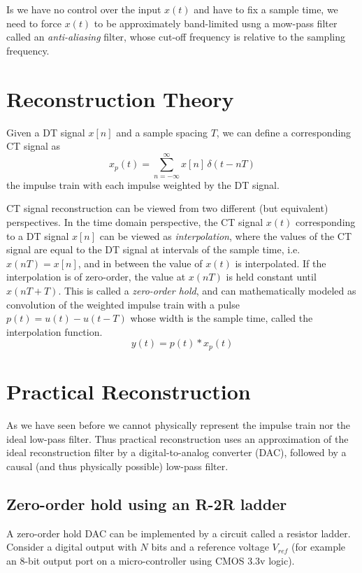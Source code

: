 \documentclass{article}
\begin{document}
Is we have no control over the input $x(t)$ and have to fix a sample time, we need to force $x(t)$ to be approximately band-limited usng a mow-pass filter called an \textit{anti-aliasing} filter, whose cut-off frequency is relative to the sampling frequency.

\section{Reconstruction Theory}

Given a DT signal $x[n]$ and a sample spacing $T$, we can define a corresponding CT signal as 
\[
x_p(t) = \sum\limits_{n = -\infty}^{\infty} x[n] \, \delta(t-nT)
\]
the impulse train with each impulse weighted by the DT signal.

CT signal reconstruction can be viewed from two different (but equivalent) perspectives. In the time domain perspective, the CT signal $x(t)$ corresponding to a DT signal $x[n]$ can be viewed as \emph{interpolation}, where the values of the CT signal are equal to the DT signal at intervals of the sample time, i.e. $x(nT) = x[n]$, and in between the value of $x(t)$ is interpolated. If the interpolation is of zero-order, the value at $x(nT)$ is held constant until $x(nT+T)$. This is called a \emph{zero-order hold}, and can mathematically modeled as convolution of the weighted impulse train with a pulse $p(t) = u(t) - u(t-T)$ whose width is the sample time, called the interpolation function.
\[
y(t) = p(t)*x_p(t)
\]

\section{Practical Reconstruction}

As we have seen before we cannot physically represent the impulse train nor the ideal low-pass filter. Thus practical reconstruction uses an approximation of the ideal reconstruction filter by a digital-to-analog converter (DAC), followed by a causal (and thus physically possible) low-pass filter.

\subsection{Zero-order hold using an R-2R ladder}

A zero-order hold DAC can be implemented by a circuit called a resistor ladder. Consider a digital output with $N$ bits and a reference voltage $V_{ref}$ (for example an 8-bit output port on a micro-controller using CMOS 3.3v logic).
\end{document}
